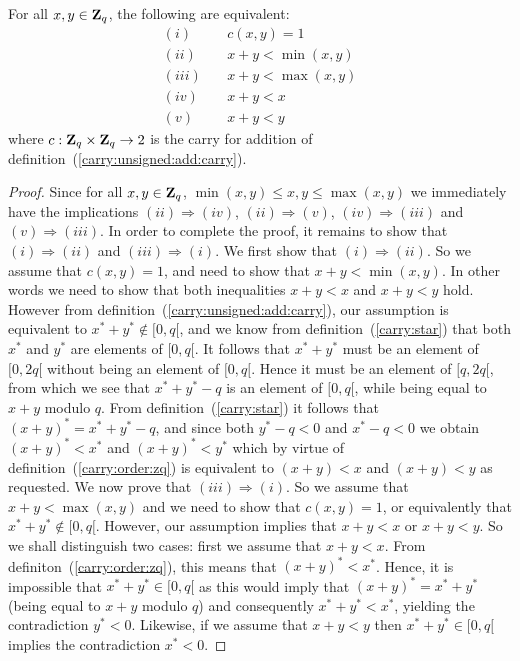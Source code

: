 \documentclass{article}
\newcommand{\zq}{\mbox{${\bf Z}_{q}$}}
\begin{document}
\begin{prop}\label{carry:unsigned:add:criterium}
  For all $x,y\in\zq$, the following are equivalent:
    \begin{eqnarray*}
      (i)&\ &c(x,y) = 1\\
      (ii)&\ & x + y < \min(x,y)\\
      (iii)&\ & x + y < \max(x,y)\\
      (iv)&\ & x + y < x\\
      (v) &\ & x + y < y
    \end{eqnarray*}
where $c:\zq\times\zq\rightarrow 2$ is the carry for addition of 
  definition~(\ref{carry:unsigned:add:carry}).
\end{prop}
\begin{proof}
  Since for all $x,y\in\zq$, $\min(x,y)\leq x, y\leq\max(x,y)$ we immediately 
  have the implications $(ii)\Rightarrow(iv)$, $(ii)\Rightarrow(v)$, 
  $(iv)\Rightarrow(iii)$ and $(v)\Rightarrow(iii)$. In order to complete
  the proof, it remains to show that $(i)\Rightarrow(ii)$ and 
  $(iii)\Rightarrow(i)$. We first show that $(i)\Rightarrow(ii)$. So 
  we assume that $c(x,y) = 1$, and need to show that $x+y<\min(x,y)$.
  In other words we need to show that both inequalities $x+y<x$ and 
  $x+y<y$ hold. However from definition~(\ref{carry:unsigned:add:carry}),
  our assumption is equivalent to $x^{*}+y^{*}\not\in[0,q[$, and we know
  from definition~(\ref{carry:star}) that both $x^{*}$ and $y^{*}$ are elements
  of $[0,q[$. It follows that $x^{*}+y^{*}$ must be an element of $[0,2q[$
  without being an element of $[0,q[$. Hence it must be an element of
  $[q,2q[$, from which we see that $x^{*}+y^{*}-q$ is an element of $[0,q[$,
  while being equal to $x+y$ modulo $q$. From definition~(\ref{carry:star})
  it follows that $(x+y)^{*}=x^{*}+y^{*}-q$, and since both $y^{*}-q <0$ and 
  $x^{*}-q<0$ we obtain $(x+y)^{*}<x^{*}$ and $(x+y)^{*}<y^{*}$ which by
  virtue of definition~(\ref{carry:order:zq}) is equivalent to $(x+y)<x$ and 
  $(x+y)<y$ as requested. We now prove that $(iii)\Rightarrow(i)$. So we
  assume that $x+y <\max(x,y)$ and we need to show that $c(x,y)=1$, or
  equivalently that $x^{*}+y^{*}\not\in[0,q[$. However, our assumption
  implies that $x+y<x$ or $x+y<y$. So we shall distinguish two cases:
  first we assume that $x+y<x$. From definiton~(\ref{carry:order:zq}), 
  this means that $(x+y)^{*}<x^{*}$. Hence, it is impossible that 
  $x^{*}+y^{*}\in[0,q[$ as this would imply that $(x+y)^{*}=x^{*}+y^{*}$ 
  (being equal to $x+y$ modulo $q$) and consequently $x^{*}+y^{*}<x^{*}$, 
  yielding the contradiction $y^{*}<0$. Likewise, if we assume that $x+y<y$ 
  then $x^{*}+y^{*}\in[0,q[$ implies the contradiction $x^{*}<0$.
\end{proof}
\end{document}
